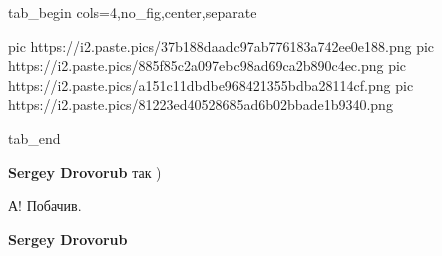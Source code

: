 \ifcmt
  tab_begin cols=4,no_fig,center,separate

     pic https://i2.paste.pics/37b188daadc97ab776183a742ee0e188.png
		 pic https://i2.paste.pics/885f85c2a097ebc98ad69ca2b890c4ec.png
		 pic https://i2.paste.pics/a151c11dbdbe968421355bdba28114cf.png
		 pic https://i2.paste.pics/81223ed40528685ad6b02bbade1b9340.png

  tab_end
\fi


\begin{itemize} %
\textbf{Sergey Drovorub} так )
\end{itemize} %


А! Побачив.

\begin{itemize} %
\textbf{Sergey Drovorub} 🙂
\end{itemize} %
